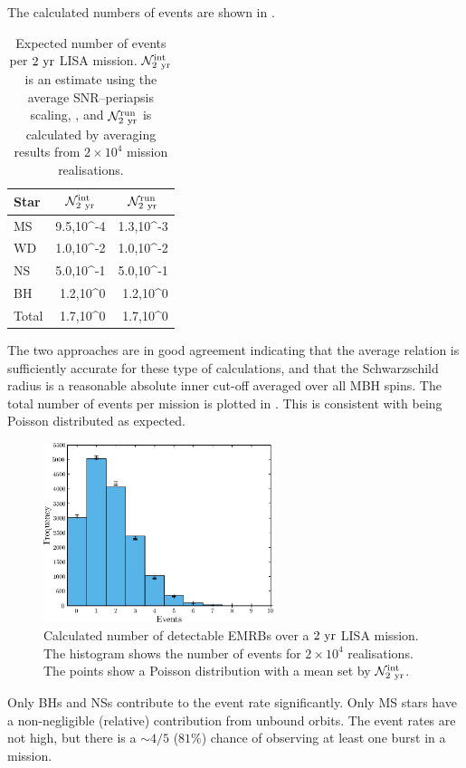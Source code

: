 The calculated numbers of events are shown in . 
\begin{table}\footnotesize
\centering
  \begin{tabular}{l D{,}{\,\times\,}{3.4} D{,}{\,\times\,}{3.4}}
  \toprule
  Star &  &  \\ \midrule
  MS & 9.5,10^{-4} & 1.3,10^{-3} \\
  WD & 1.0,10^{-2} & 1.0,10^{-2} \\
  NS & 5.0,10^{-1} & 5.0,10^{-1}  \\
  BH & 1.2,10^{0} & 1.2,10^{0} \\
  \midrule
  Total & 1.7,10^{0} & 1.7,10^{0} \\
  \bottomrule
\end{tabular}
  \caption{Expected number of events per $2~\mathrm{yr}$ LISA mission. $\mathcal{N}_{2~\mathrm{yr}}^\mathrm{int}$ is an estimate using the average SNR--periapsis scaling, , and $\mathcal{N}_{2~\mathrm{yr}}^\mathrm{run}$ is calculated by averaging results from $2 \times 10^4$ mission realisations.}\label{tab:Rates}
\end{table}
The two approaches are in good agreement indicating that the average relation  is sufficiently accurate for these type of calculations, and that the Schwarzschild radius is a reasonable absolute inner cut-off averaged over all MBH spins. The total number of events per mission is plotted in . 
This is consistent with being Poisson distributed as expected.
\begin{figure}%
\centering
   \includegraphics[width=0.6\textwidth]{./images/Fig_Total_event_hist}
\caption{Calculated number of detectable EMRBs over a $2~\mathrm{yr}$ LISA mission. The histogram shows the number of events for $2 \times 10^4$ realisations. The points show a Poisson distribution with a mean set by $\mathcal{N}_{2~\mathrm{yr}}^\mathrm{int}$.}
\label{fig:Event-no}
\end{figure}
Only BHs and NSs contribute to the event rate significantly. Only MS stars have a non-negligible (relative) contribution from unbound orbits. The event rates are not high, but there is a $\sim 4/5$ ($81\%$) chance of observing at least one burst in a mission.

